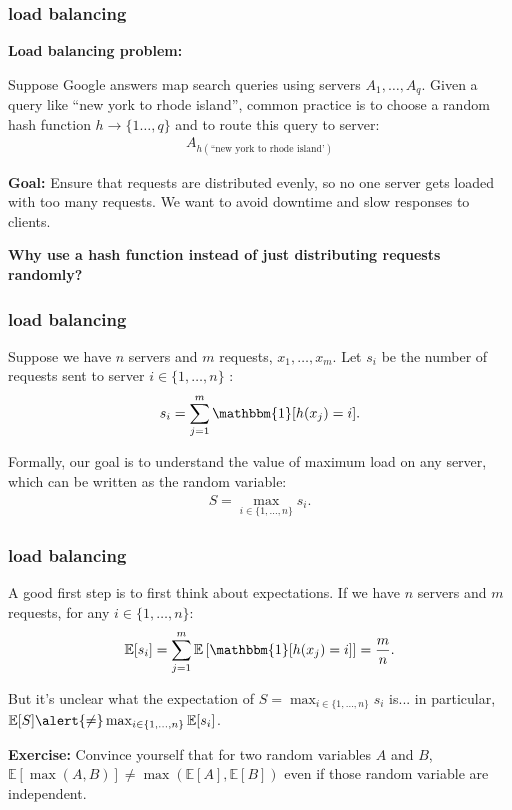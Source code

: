 \documentclass[compress]{beamer}
\newcommand{\E}{\mathbb{E}}
\begin{document}
\begin{frame}
	\frametitle{load balancing}
	\textbf{Load balancing problem:}
	
	Suppose Google answers map search queries using servers $A_1, \ldots, A_q$. Given a query like ``new york to rhode island'', common practice is to choose a random hash function $h \rightarrow \{1\ldots, q\}$ and to route this query to server:
	\begin{align*}
		A_{h(\text{``new york to rhode island'})}
	\end{align*}

	\textbf{Goal:} Ensure that requests are distributed evenly, so no one server gets loaded with too many requests. We want to avoid  downtime and slow responses to clients. 
	
	\begin{center}
		\alert{\textbf{Why use a hash function instead of just distributing requests randomly?}}
	\end{center}
	

\end{frame}

\begin{frame}
	\frametitle{load balancing}
	Suppose we have $n$ servers and $m$ requests, $x_1,\ldots, x_m$. Let $s_i$ be the number of requests sent to server $i \in \{1,\ldots, n\}$ :
	\begin{align*}
		s_i = \sum_{j=1}^m \mathbbm{1}[h(x_j) = i]. 
	\end{align*}
	
	Formally, our goal is to understand the value of maximum load on any server, which can be written as the random variable:
	\begin{align*}
		S = \max_{i\in \{1,\ldots, n\}} s_i.
	\end{align*}	
\end{frame}

\begin{frame}
	\frametitle{load balancing}
	A good first step is to first think about expectations. 
	If we have $n$ servers and $m$ requests, for any $i\in \{1,\ldots, n\}$:
	\begin{align*}
		\E[s_i] = \sum_{j=1}^m \E\left[\mathbbm{1}[h(x_j) = i]\right] = \frac{m}{n}.
	\end{align*}
	
	But it's unclear what the expectation of $S = \max_{i\in \{1,\ldots, n\}} s_i$ is... in particular, $\E[S] \alert{\neq} \max_{i\in \{1,\ldots, n\}} \E[s_i]$. 
	
	\textbf{Exercise:} Convince yourself that for two random variables $A$ and $B$, $\E[\max(A,B)] \neq \max(\E[A], \E[B])$ even if those random variable are independent. 
\end{frame}
\end{document}
